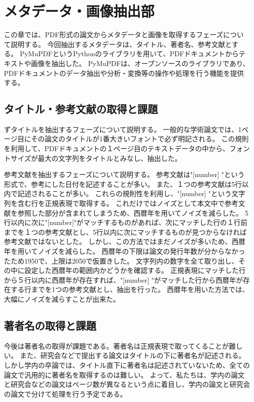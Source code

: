 \documentclass{ltjsarticle}
\begin{document}
\section{メタデータ・画像抽出部}
この章では、PDF形式の論文からメタデータと画像を取得するフェーズについて説明する。
今回抽出するメタデータは、タイトル、著者名、参考文献とする。
PyMuPDFというPythonのライブラリを用いて、PDFドキュメントからテキストや画像を抽出した。
PyMuPDFは、オープンソースのライブラリであり、PDFドキュメントのデータ抽出や分析・変換等の操作や処理を行う機能を提供する。


\subsection{タイトル・参考文献の取得と課題}

ずタイトルを抽出するフェーズについて説明する。
一般的な学術論文では、1ページ目にその論文のタイトルが1番大きいフォントで必ず明記される。
この規則を利用して、PDFドキュメントの１ページ目のテキストデータの中から、フォントサイズが最大の文字列をタイトルとみなし、抽出した。

参考文献を抽出するフェーズについて説明する。
参考文献は"[number] "という形式で、参考にした日付を記述することが多い。
また、１つの参考文献は5行以内で記述されることが多い。
これらの規則性を利用し、"[number] "という文字列を含む行を正規表現で取得する。
これだけではノイズとして本文中で参考文献を参照した部分が含まれてしまうため、西暦年を用いてノイズを減らした。
5行以内に次に"[number]"がマッチするものがあれば、次にマッチした行の１行前までを１つの参考文献とし、5行以内に次にマッチするものが見つからなければ参考文献ではないとした。
しかし、この方法ではまだノイズが多いため、西暦年を用いてノイズを減らした。
西暦年の下限は論文の発行年数が分からなかったため1950で、上限は2050で仮置きした。
文字列内の数字を全て取り出し、その中に設定した西暦年の範囲内かどうかを確認する。
正規表現にマッチした行から５行以内に西暦年が存在すれば、"[number] "がマッチした行から西暦年が存在する行までを1つの参考文献とし、抽出を行った。
西暦年を用いた方法では、大幅にノイズを減らすことが出来た。


\subsection{著者名の取得と課題}
今後は著者名の取得が課題である。著者名は正規表現で取ってくることが難しい。
また、研究会などで提出する論文はタイトルの下に著者名が記述される。
しかし学内の卒論では、タイトル直下に著者名は記述されていないため、全ての論文で汎用的に著者名を取得するのは難しい。
よって、私たちは、学内の論文と研究会などの論文はページ数が異なるという点に着目し、学内の論文と研究会の論文で分けて処理を行う予定である。
\end{document}
